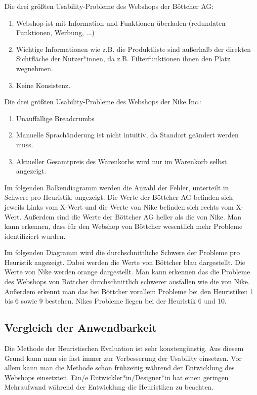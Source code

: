\documentclass[utf8,biblatex]{lni}
\begin{document}
Die drei größten Usability-Probleme des Webshops der Böttcher AG:
\begin{enumerate}
  \item Webshop ist mit Information und Funktionen überladen (redundaten Funktionen, Werbung, ...)
  \item Wichtige Informationen wie z.B. die Produktliste sind außerhalb der direkten Sichtfläche der Nutzer*innen, da z.B. Filterfunktionen ihnen den Platz wegnehmen.
  \item Keine Konsistenz.
\end{enumerate}


Die drei größten Usability-Probleme des Webshops der Nike Inc.:
\begin{enumerate}
  \item Unauffällige Breadcrumbs
  \item Manuelle Sprachänderung ist nicht intuitiv, da Standort geändert werden muss.
  \item Aktueller Gesamtpreis des Warenkorbs wird nur im Warenkorb selbst angezeigt.
\end{enumerate}

Im folgenden Balkendiagramm werden die Anzahl der Fehler, unterteilt in Schwere pro Heuristik, angezeigt. Die Werte der Böttcher AG befinden sich jeweils Links vom X-Wert und die Werte von Nike befinden sich rechts vom X-Wert. Außerdem sind die Werte der Böttcher AG heller als die von Nike. Man kann erkennen, dass für den Webshop von Böttcher wesentlich mehr Probleme identifiziert wurden.



Im folgenden Diagramm wird die durchschnittliche Schwere der Probleme pro Heuristik angezeigt. Dabei werden die Werte von Böttcher blau dargestellt. Die Werte von Nike werden orange dargestellt. Man kann erkennen das die Probleme des Webshops von Böttcher durchschnittlich schwerer ausfallen wie die von Nike. Außerdem erkennt man das bei Böttcher vorallem Probleme bei den Heuristiken 1 bis 6 sowie 9 bestehen. Nikes Probleme liegen bei der Heuristik 6 und 10. 




\subsection{Vergleich der Anwendbarkeit}
Die Methode der Heuristischen Evaluation ist sehr konstengünstig. Aus diesem Grund kann man sie fast immer zur Verbesserung der Usability einsetzen. Vor allem kann man die Methode schon frühzeitig während der Entwicklung des Webshops einsetzten. Ein/e Entwickler*in/Designer*in hat einen geringen Mehraufwand während der Entwicklung die Heuristiken zu beachten. 
\end{document}

